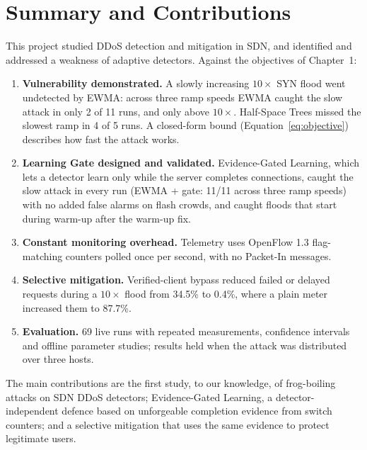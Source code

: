 \documentclass[12pt,a4paper,oneside]{report}
\begin{document}
\section{Summary and Contributions}
This project studied DDoS detection and mitigation in SDN, and identified and addressed a weakness of adaptive detectors. Against the objectives of Chapter~1:
\begin{enumerate}
\item \textbf{Vulnerability demonstrated.} A slowly increasing $10\times$ SYN flood went undetected by EWMA: across three ramp speeds EWMA caught the slow attack in only 2 of 11 runs, and only above $10\times$. Half-Space Trees missed the slowest ramp in 4 of 5 runs. A closed-form bound (Equation~\eqref{eq:objective}) describes how fast the attack works.
\item \textbf{Learning Gate designed and validated.} Evidence-Gated Learning, which lets a detector learn only while the server completes connections, caught the slow attack in every run (EWMA + gate: 11/11 across three ramp speeds) with no added false alarms on flash crowds, and caught floods that start during warm-up after the warm-up fix.
\item \textbf{Constant monitoring overhead.} Telemetry uses OpenFlow 1.3 flag-matching counters polled once per second, with no Packet-In messages.
\item \textbf{Selective mitigation.} Verified-client bypass reduced failed or delayed requests during a $10\times$ flood from 34.5\% to 0.4\%, where a plain meter increased them to 87.7\%.
\item \textbf{Evaluation.} 69 live runs with repeated measurements, confidence intervals and offline parameter studies; results held when the attack was distributed over three hosts.
\end{enumerate}
The main contributions are the first study, to our knowledge, of frog-boiling attacks on SDN DDoS detectors; Evidence-Gated Learning, a detector-independent defence based on unforgeable completion evidence from switch counters; and a selective mitigation that uses the same evidence to protect legitimate users.
\end{document}

